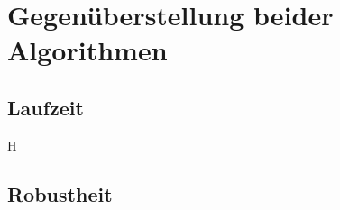 

\section{Gegenüberstellung beider Algorithmen}
\label{sec:gegenueberstellung}

\subsection{Laufzeit}
\label{subsec:discussion_performance}

H
\subsection{Robustheit}
\label{subsec:discussion_robustness}
